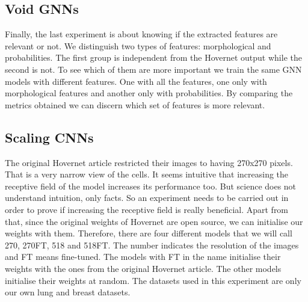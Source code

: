 \subsection{Void GNNs}\label{subsec:void-gnn}

Finally, the last experiment is about knowing if the extracted features are relevant or not. We distinguish two types of features: morphological and probabilities. The first group is independent from the Hovernet output while the second is not. To see which of them are more important we train the same GNN models with different features. One with all the features, one only with morphological features and another only with probabilities. By comparing the metrics obtained we can discern which set of features is more relevant.

\subsection{Scaling CNNs}\label{subsec:scaling}

The original Hovernet article restricted their images to having 270x270 pixels. That is a very narrow view of the cells. It seems intuitive that increasing the receptive field of the model increases its performance too. But science does not understand intuition, only facts. So an experiment needs to be carried out in order to prove if increasing the receptive field is really beneficial. Apart from that, since the original weights of Hovernet are open source, we can initialise our weights with them. Therefore, there are four different models that we will call 270, 270FT, 518 and 518FT. The number indicates the resolution of the images and FT means fine-tuned. The models with FT in the name initialise their weights with the ones from the original Hovernet article. The other models initialise their weights at random. The datasets used in this experiment are only our own lung and breast datasets.